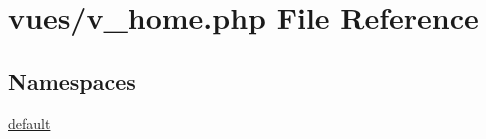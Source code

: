 \hypertarget{v__home_8php}{}\section{vues/v\+\_\+home.php File Reference}
\label{v__home_8php}
\subsection*{Namespaces}
\begin{DoxyCompactItemize}
\item 
 \hyperlink{namespacedefault}{default}
\end{DoxyCompactItemize}
